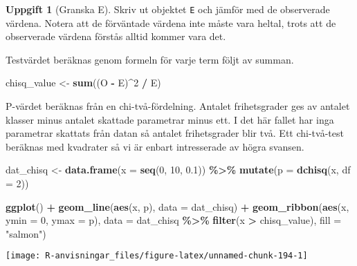 \documentclass[
]{book}
\newenvironment{Shaded}{\begin{snugshade}}{\end{snugshade}}
\newcommand{\AttributeTok}[1]{\textcolor[rgb]{0.13,0.29,0.53}{#1}}
\newcommand{\DecValTok}[1]{\textcolor[rgb]{0.00,0.00,0.81}{#1}}
\newcommand{\FloatTok}[1]{\textcolor[rgb]{0.00,0.00,0.81}{#1}}
\newcommand{\FunctionTok}[1]{\textcolor[rgb]{0.13,0.29,0.53}{\textbf{#1}}}
\newcommand{\NormalTok}[1]{#1}
\newcommand{\OtherTok}[1]{\textcolor[rgb]{0.56,0.35,0.01}{#1}}
\newcommand{\SpecialCharTok}[1]{\textcolor[rgb]{0.81,0.36,0.00}{\textbf{#1}}}
\newcommand{\StringTok}[1]{\textcolor[rgb]{0.31,0.60,0.02}{#1}}
\theoremstyle{definition}
\theoremstyle{definition}
\theoremstyle{definition}
\newtheorem{exercise}{Uppgift}[chapter]
\theoremstyle{definition}
\theoremstyle{remark}
\begin{document}
\begin{exercise}[Granska E]
Skriv ut objektet \texttt{E} och jämför med de observerade värdena. Notera att de förväntade värdena inte måste vara heltal, trots att de observerade värdena förstås alltid kommer vara det.
\end{exercise}

Testvärdet beräknas genom formeln för varje term följt av summan.

\begin{Shaded}
\begin{Highlighting}[]
\NormalTok{chisq\_value }\OtherTok{\textless{}{-}} \FunctionTok{sum}\NormalTok{((O }\SpecialCharTok{{-}}\NormalTok{ E)}\SpecialCharTok{\^{}}\DecValTok{2} \SpecialCharTok{/}\NormalTok{ E)}
\end{Highlighting}
\end{Shaded}

P-värdet beräknas från en chi-två-fördelning. Antalet frihetsgrader ges av antalet klasser minus antalet skattade parametrar minus ett. I det här fallet har inga parametrar skattats från datan så antalet frihetsgrader blir två. Ett chi-två-test beräknas med kvadrater så vi är enbart intresserade av högra svansen.

\begin{Shaded}
\begin{Highlighting}[]
\NormalTok{dat\_chisq }\OtherTok{\textless{}{-}} \FunctionTok{data.frame}\NormalTok{(}\AttributeTok{x =} \FunctionTok{seq}\NormalTok{(}\DecValTok{0}\NormalTok{, }\DecValTok{10}\NormalTok{, }\FloatTok{0.1}\NormalTok{)) }\SpecialCharTok{\%\textgreater{}\%} 
  \FunctionTok{mutate}\NormalTok{(}\AttributeTok{p =} \FunctionTok{dchisq}\NormalTok{(x, }\AttributeTok{df =} \DecValTok{2}\NormalTok{))}

\FunctionTok{ggplot}\NormalTok{() }\SpecialCharTok{+}
  \FunctionTok{geom\_line}\NormalTok{(}\FunctionTok{aes}\NormalTok{(x, p), }\AttributeTok{data =}\NormalTok{ dat\_chisq) }\SpecialCharTok{+}
  \FunctionTok{geom\_ribbon}\NormalTok{(}\FunctionTok{aes}\NormalTok{(x, }\AttributeTok{ymin =} \DecValTok{0}\NormalTok{, }\AttributeTok{ymax =}\NormalTok{ p), }\AttributeTok{data =}\NormalTok{ dat\_chisq }\SpecialCharTok{\%\textgreater{}\%} \FunctionTok{filter}\NormalTok{(x }\SpecialCharTok{\textgreater{}}\NormalTok{ chisq\_value), }\AttributeTok{fill =} \StringTok{"salmon"}\NormalTok{)}
\end{Highlighting}
\end{Shaded}

\begin{center}\texttt{[image: R-anvisningar\_files/figure-latex/unnamed-chunk-194-1]} \end{center}
\end{document}
